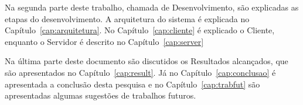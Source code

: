 Na segunda parte deste trabalho, chamada de Desenvolvimento, são explicadas as etapas do desenvolvimento. A arquitetura do sistema é explicada no Capítulo~\ref{cap:arquitetura}. No Capítulo~\ref{cap:cliente} é explicado o Cliente, enquanto o Servidor é descrito no Capítulo~\ref{cap:server}

Na última parte deste documento são discutidos os Resultados alcançados, que são apresentados no Capítulo~\ref{cap:result}. Já no Capítulo~\ref{cap:conclusao} é apresentada a conclusão desta pesquisa e no Capítulo~\ref{cap:trabfut} são apresentadas algumas sugestões de trabalhos futuros.
